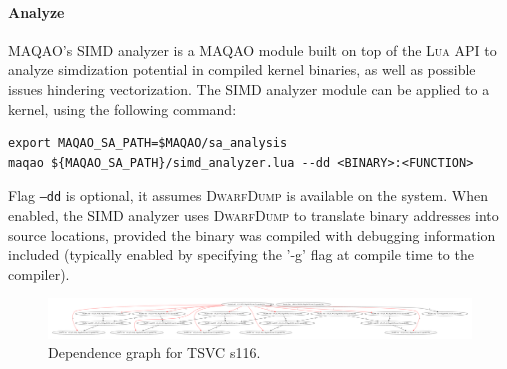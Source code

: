 \documentclass[11pt, a4paper, twoside]{montblanc2}
\def\lua{\textsc{Lua}\xspace}
\def\dd{\textsc{DwarfDump}\xspace}
\begin{document}
\paragraph{Analyze}

MAQAO's SIMD analyzer is a MAQAO module built on top of the \lua API to analyze
simdization potential in compiled kernel binaries, as well as possible issues
hindering vectorization. The SIMD analyzer module can be applied to a kernel,
using the following command:

\begin{verbatim}
export MAQAO_SA_PATH=$MAQAO/sa_analysis
maqao ${MAQAO_SA_PATH}/simd_analyzer.lua --dd <BINARY>:<FUNCTION>
\end{verbatim}

Flag \texttt{--dd} is optional, it assumes \dd is available on the system. When
enabled, the SIMD analyzer uses \dd to translate binary addresses into source
locations, provided the binary was compiled with debugging information included
(typically enabled by specifying the '-g' flag at compile time to the compiler).

\begin{figure}[h]
  \centering
\includegraphics[width=1\textwidth]{fs116_l47}
\caption{Dependence graph for TSVC s116.}\label{fig:dgs116}
\end{figure}
\end{document}
